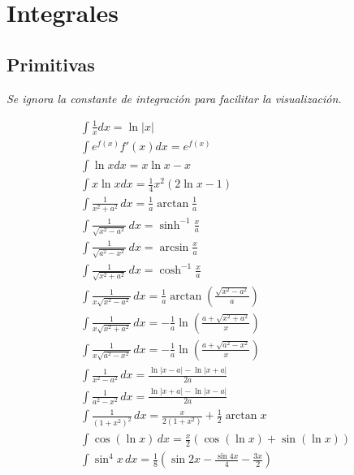 \section{Integrales}

\subsection{Primitivas}
\textit{Se ignora la constante de integración para facilitar la visualización.}\newline
\begin{minipage}{0.55\textwidth}
\begin{equation}
\begin{split}
    &\int\frac{1}{x}dx  = \ln{|x|} \\
    &\int e^{f(x)}f'(x)dx  = e^{f(x)} \\
    &\int \ln{x}dx  = x\ln{x}-x \\
    &\int x\ln{x}dx  = \frac{1}{4}x^2(2\ln{x}-1) \\
    &\int\frac{1}{x^2+a^2}\,dx  = \frac{1}{a}\arctan{\frac{1}{a}}\\
    &\int\frac{1}{\sqrt{x^2-a^2}}\,dx  = \sinh^{-1}{\frac{x}{a}}\\
    &\int\frac{1}{\sqrt{a^2-x^2}}\,dx  = \arcsin{\frac{x}{a}}\\
    &\int \frac{1}{\sqrt{x^2+a^2}}\,dx  = \cosh^{-1}{\frac{x}{a}}\\
    &\int\frac{1}{x\sqrt{x^2-a^2}}\,dx  = \frac{1}{a}\arctan{\left(\frac{\sqrt{x^2-a^2}}{a}\right)}\\
    &\int\frac{1}{x\sqrt{x^2+a^2}}\,dx  = -\frac{1}{a}\ln{\left(\frac{
    a+\sqrt{x^2+a^2}}{x}\right)}\\
    &\int\frac{1}{x\sqrt{a^2-x^2}}\,dx  = -\frac{1}{a}\ln{\left(\frac{a+\sqrt{a^2-x^2}}{x}\right)}\\
    &\int\frac{1}{x^2-a^2}\,dx  = \frac{\ln{|x-a|}-\ln{|x+a|}}{2a}\\
    &\int\frac{1}{a^2-x^2}\,dx  = \frac{\ln{|x+a|}-\ln{|x-a|}}{2a}\\
    &\int\frac{1}{(1+x^2)^2}\,dx  = \frac{x}{2(1+x^2)}+\frac{1}{2}\arctan{x}\\
    &\int\cos{(\ln{x})}\,dx= \frac{x}{2}(\cos{(\ln{x})}+\sin{(\ln{x})})\\
    &\int\sin^4{x}\,dx=\frac{1}{8}\left(\sin{2x}-
\frac{\sin{4x}}{4}-\frac{3x}{2}\right)\\
\end{split}
\nonumber
\end{equation}
\end{minipage}
